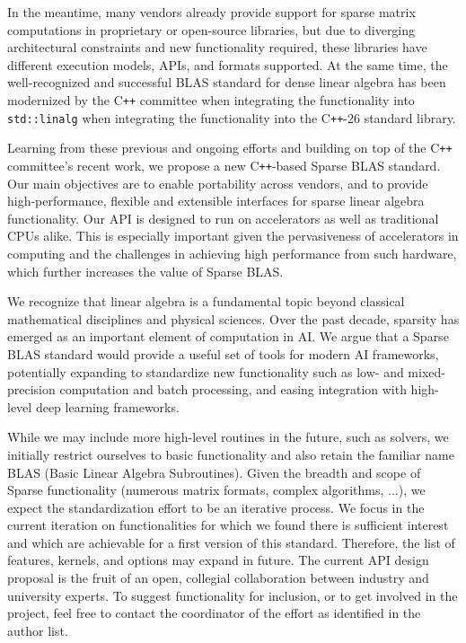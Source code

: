 \documentclass{article}
\newcommand{\cplusplus}{C\texttt{++}\xspace}
\begin{document}
In the meantime, many vendors already provide support for sparse matrix computations in proprietary or open-source libraries, but due to diverging architectural constraints and new functionality required, these libraries have different execution models, APIs, and formats supported. At the same time, the well-recognized and successful BLAS standard for dense linear algebra has been modernized by the \cplusplus committee when integrating the functionality into \texttt{std::linalg} when integrating the functionality into the \cplusplus-26 standard library.

Learning from these previous and ongoing efforts and building on top of the \cplusplus committee's recent work, we propose a new \cplusplus-based Sparse BLAS standard. Our main objectives are to enable portability across vendors, and to provide high-performance, flexible and extensible interfaces for sparse linear algebra functionality. Our API is designed to run on accelerators as well as traditional CPUs alike. This is especially important given the pervasiveness of accelerators in computing and the challenges in achieving high performance from such hardware, which further increases the value of Sparse BLAS.

We recognize that linear algebra is a fundamental topic beyond classical mathematical disciplines and physical sciences. Over the past decade, sparsity has emerged as an important element of computation in AI. We argue that a Sparse BLAS standard would provide a useful set of tools for modern AI frameworks, potentially expanding to standardize new functionality such as low- and mixed-precision computation and batch processing, and easing integration with high-level deep learning frameworks.

While we may include more high-level routines in the future, such as solvers, we initially restrict ourselves to basic functionality and also retain the familiar name BLAS (Basic Linear Algebra Subroutines). Given the breadth and scope of Sparse functionality (numerous matrix formats, complex algorithms, ...), we expect the standardization effort to be an iterative process. We focus in the current iteration on functionalities for which we found there is sufficient interest and which are achievable for a first version of this standard. Therefore, the list of features, kernels, and options may expand in future. The current API design proposal is the fruit of an open, collegial collaboration between industry and university experts. To suggest functionality for inclusion, or to get involved in the project, feel free to contact the coordinator of the effort as identified in the author list.
\end{document}
